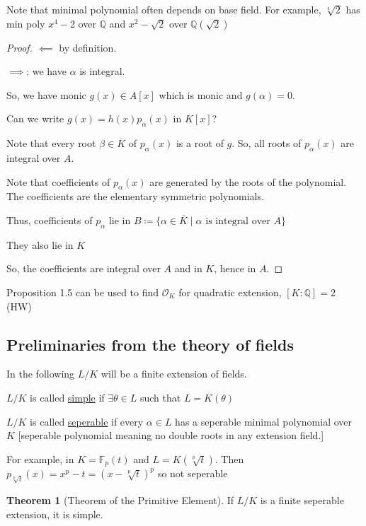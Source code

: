 \documentclass[openany]{amsbook}
\numberwithin{section}{chapter}
\theoremstyle{definition}
\newtheorem{theorem}{Theorem}[chapter]
\begin{document}
Note that minimal polynomial often depends on base field. For example, \(\sqrt[4]{2}\) has min poly \(x^4 - 2\) over \(\mathbb{Q}\) and \(x^2 - \sqrt{2}\) over \(\mathbb{Q} (\sqrt{2})\) 

\begin{proof}
    \(\impliedby\) by definition.

    \(\implies \): we have \(\alpha \) is integral.

    So, we have monic \(g(x)\in A[x]\) which is monic and \(g(\alpha) = 0\).

    Can we write \(g(x) = h(x) p_\alpha(x)\) in \(K[x]\)?

    Note that every root \(\beta\in \overline{K}\) of \(p_\alpha(x)\) is a root of \(g\). So, all roots of \(p_\alpha(x)\) are integral over \(A\).
    
    Note that coefficients of \(p_\alpha(x)\) are generated by the roots of the polynomial. The coefficients are the elementary symmetric polynomials.

    Thus, coefficients of \(p_\alpha\) lie in \(B \coloneqq \{ \alpha \in \overline{K} \mid \alpha \text{ is integral over } A \} \) 
    
    They also lie in \(K\)

    So, the coefficients are integral over \(A\) and in \(K\), hence in \(A\).

\end{proof}

Proposition 1.5 can be used to find \(\mathcal{O}_K\) for quadratic extension, \([K : \mathbb{Q} ] = 2\) (HW)

\subsection*{Preliminaries from the theory of fields}


In the following \(L / K\) will be a finite extension of fields.

\(L / K\) is called \underline{simple} if \(\exists \theta \in L\) such that \(L = K(\theta)\) 

\(L / K\) is called \underline{seperable} if every \(\alpha \in L\) has a seperable minimal polynomial over \(K\) [seperable polynomial meaning no double roots in any extension field.]

For example, in \(K = \mathbb{F}_p(t)\) and \(L   = K(\sqrt[p]{t})\). Then \(p_{\sqrt[p]{t}}(x) = x^p - t = (x - \sqrt[p]{t})^p\) so not seperable

\begin{theorem}
    [Theorem of the Primitive Element]
    
    If \(L / K\) is a finite seperable extension, it is simple. 
\end{theorem}
\end{document}
